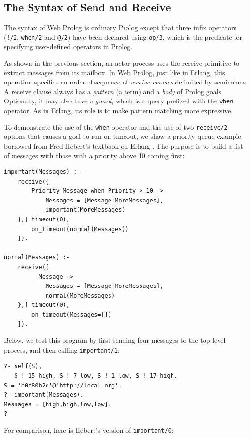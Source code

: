 \documentclass{tlp}
\begin{document}
\subsection{The Syntax of Send and Receive}

The syntax of Web Prolog is ordinary Prolog except that three infix operators (\texttt{!/2}, \texttt{when/2} and \texttt{@/2}) have been declared using \texttt{op/3}, which is the predicate for specifying user-defined operators in Prolog. 

As shown in the previous section, an actor process uses the receive primitive to extract messages from its mailbox. In Web Prolog, just like in Erlang, this operation specifies an ordered sequence of \textit{receive clauses} delimited by semicolons. A receive clause always has a \textit{pattern} (a term) and a \textit{body} of Prolog goals. Optionally, it may also have a \textit{guard}, which is a query prefixed with the \texttt{when} operator. As in Erlang, its role is to make pattern matching more expressive.

To demonstrate the use of the \texttt{when} operator and the use of two \texttt{receive/2} options that causes a goal to run on timeout, we show a priority queue example borrowed from Fred H\'ebert's textbook on Erlang \cite{Hebert:2013:LYE:2543986}. The purpose is to build a list of messages with those with a priority above 10 coming first:

\begin{lstlisting}
important(Messages) :-
    receive({
        Priority-Message when Priority > 10 ->
            Messages = [Message|MoreMessages],
            important(MoreMessages)
    },[ timeout(0),
        on_timeout(normal(Messages))
    ]).

normal(Messages) :-
    receive({
        _-Message ->
            Messages = [Message|MoreMessages],
            normal(MoreMessages)
    },[ timeout(0),
        on_timeout(Messages=[])
    ]).
\end{lstlisting}

\noindent Below, we test this program by first sending four messages to the top-level process, and then calling \texttt{important/1}:

\begin{lstlisting}
?- self(S),
   S ! 15-high, S ! 7-low, S ! 1-low, S ! 17-high.
S = 'b0f80b2d'@'http://local.org'.
?- important(Messages).
Messages = [high,high,low,low].
?- 
\end{lstlisting}

\noindent For comparison, here is H\'ebert's version of \texttt{important/0}:
\end{document}
